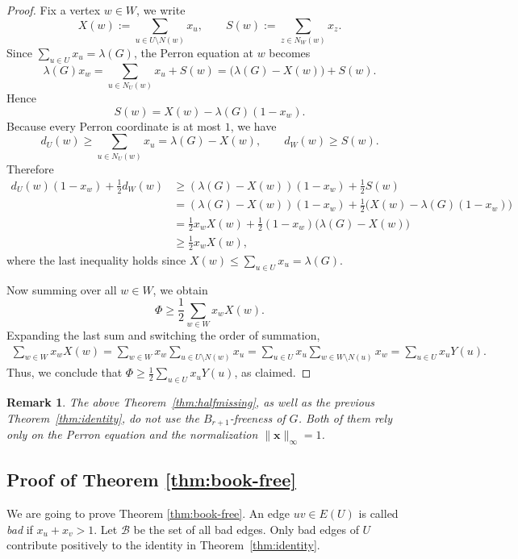 \documentclass[10pt,a4paper]{amsart}
\newtheorem{remark}{Remark}
\renewcommand{\le}{\leqslant}
\renewcommand{\ge}{\geqslant}
\begin{document}
\begin{proof}
Fix a vertex $w\in W$, we write
\[ X(w):=\sum_{u\in U\setminus N(w)}x_u,\qquad 
S(w):=\sum_{z\in N_W(w)}x_z.
\]
Since $\sum_{u\in U}x_u=\lambda(G)$, the Perron equation at $w$ becomes
\[
\lambda(G)x_w=\sum_{u\in N_U(w)}x_u+S(w)=\bigl(\lambda(G)-X(w)\bigr)+S(w).
\]
Hence
\[
S(w)=X(w)-\lambda(G)(1-x_w).
\]
Because every Perron coordinate is at most $1$, we have
\[
d_U(w)\ge \sum_{u\in N_U(w)}x_u=\lambda(G)-X(w),
\qquad
 d_W(w)\ge S(w).
\]
Therefore
\begin{align*}
d_U(w)(1-x_w)+\frac12 d_W(w) 
&\ge (\lambda(G)-X(w))(1-x_w)+\frac12 S(w)\\
&=(\lambda(G)-X(w))(1-x_w)+\frac12\bigl(X(w)-\lambda(G)(1-x_w)\bigr)\\
&=\frac12 x_wX(w)+\frac12(1-x_w)\bigl(\lambda(G)-X(w)\bigr)\\
&\ge \frac12 x_wX(w),
\end{align*}
where the last inequality holds since $X(w)\le \sum_{u\in U}x_u=\lambda(G)$.

Now summing over all $w\in W$, we obtain 
\[
\Phi \ge \frac12\sum_{w\in W}x_wX(w).
\]
Expanding the last sum and switching the order of summation,
\begin{align*}
\sum_{w\in W}x_wX(w)
=\sum_{w\in W}x_w\sum_{u\in U\setminus N(w)}x_u 
=\sum_{u\in U}x_u\sum_{w\in W\setminus N(u)}x_w =\sum_{u\in U}x_uY(u).
\end{align*} 
Thus, we conclude that 
$\Phi\ge \frac12\sum_{u\in U}x_uY(u)$, 
as claimed.
\end{proof}

\begin{remark}
    The above Theorem~\ref{thm:halfmissing}, as well as the previous Theorem~\ref{thm:identity}, do not use the $B_{r+1}$-freeness of $G$. Both of them rely
only on the Perron equation and the normalization $\|\bm{x}\|_{\infty} =1$.  
\end{remark}



\subsection{Proof of Theorem \ref{thm:book-free}}


We are going to prove Theorem \ref{thm:book-free}. 
An edge $uv\in E(U)$ is called \emph{bad} if
$x_u+x_v>1$. Let $\mathcal{B}$ be the set of all bad edges. 
Only bad edges of $U$ contribute positively to the identity in Theorem~\ref{thm:identity}. 
\end{document}
